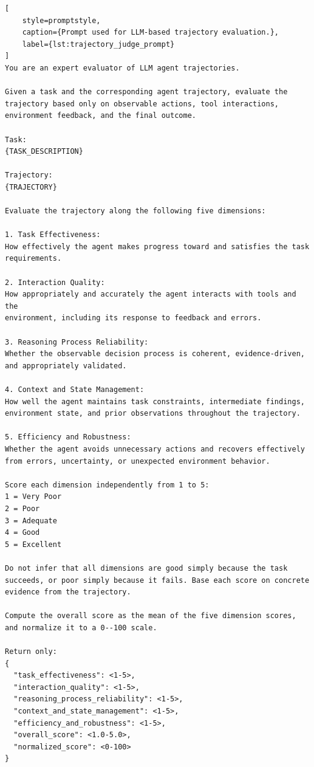 \documentclass{article} %
\begin{document}
\begin{lstlisting}[
    style=promptstyle,
    caption={Prompt used for LLM-based trajectory evaluation.},
    label={lst:trajectory_judge_prompt}
]
You are an expert evaluator of LLM agent trajectories.

Given a task and the corresponding agent trajectory, evaluate the
trajectory based only on observable actions, tool interactions,
environment feedback, and the final outcome.

Task:
{TASK_DESCRIPTION}

Trajectory:
{TRAJECTORY}

Evaluate the trajectory along the following five dimensions:

1. Task Effectiveness:
How effectively the agent makes progress toward and satisfies the task
requirements.

2. Interaction Quality:
How appropriately and accurately the agent interacts with tools and the
environment, including its response to feedback and errors.

3. Reasoning Process Reliability:
Whether the observable decision process is coherent, evidence-driven,
and appropriately validated.

4. Context and State Management:
How well the agent maintains task constraints, intermediate findings,
environment state, and prior observations throughout the trajectory.

5. Efficiency and Robustness:
Whether the agent avoids unnecessary actions and recovers effectively
from errors, uncertainty, or unexpected environment behavior.

Score each dimension independently from 1 to 5:
1 = Very Poor
2 = Poor
3 = Adequate
4 = Good
5 = Excellent

Do not infer that all dimensions are good simply because the task
succeeds, or poor simply because it fails. Base each score on concrete
evidence from the trajectory.

Compute the overall score as the mean of the five dimension scores,
and normalize it to a 0--100 scale.

Return only:
{
  "task_effectiveness": <1-5>,
  "interaction_quality": <1-5>,
  "reasoning_process_reliability": <1-5>,
  "context_and_state_management": <1-5>,
  "efficiency_and_robustness": <1-5>,
  "overall_score": <1.0-5.0>,
  "normalized_score": <0-100>
}
\end{lstlisting}
\end{document}
